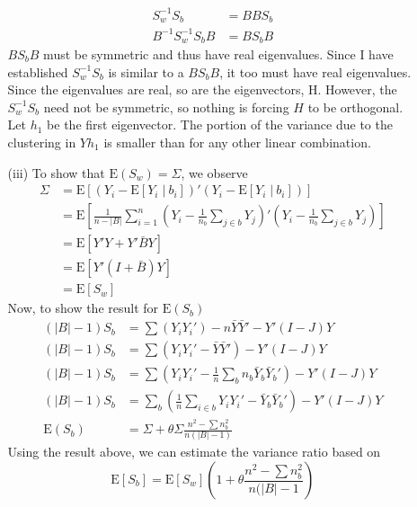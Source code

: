 \documentclass[11pt]{article}
\newcommand{\E}{\mathrm{E}}
\newcommand{\st}{ \; \big | \:}
\newcommand{\car}[1]{\left\vert #1 \right\vert}
\theoremstyle{definition}
\begin{document}
\begin{itemize}
\begin{itemize}
                \begin{align*}
                    S_w^{-1}S_b     &= BBS_b \\
                    B^{-1}S_w^{-1}S_bB &= BS_bB
                \end{align*}
                $BS_bB$ must be symmetric and thus have real eigenvalues. Since I have established $S_w^{-1}S_b$ is similar to a $BS_bB$, it too must have real eigenvalues. Since the eigenvalues are real, so are the eigenvectors, H. However, the $S_w^{-1}S_b$ need not be symmetric, so nothing is forcing $H$ to be orthogonal. Let $h_1$ be the first eigenvector. The portion of the variance due to the clustering in $Yh_1$ is smaller than for any other linear combination.
            \item[(iii)]
                To show that $\E(S_w)=\Sigma$, we observe
                \begin{align*}
                    \Sigma &= \E\left[\left(Y_i-\E[Y_i\st b_i]\right)'\left(Y_i-\E[Y_i\st b_i]\right)\right] \\
                           &= \E\left[\frac{1}{n-\car{B}}\sum_{i=1}^n\left(Y_i-\frac{1}{n_b}\sum_{j\in b} Y_j\right)'\left(Y_i-\frac{1}{n_b}\sum_{j\in b} Y_j\right)     \right] \\
                           &= \E\left[Y'Y + Y'\bar B Y\right] \\
                           &= \E\left[Y'(I+\bar B)Y\right] \\
                           &= \E\left[S_w\right] 
                \end{align*}
                Now, to show the result for $\E(S_b)$
                \begin{align*}
                    (\car{B}-1)S_b &= \sum(Y_iY_i') - n\bar Y\bar Y' - Y'(I-J)Y  \\
                    (\car{B}-1)S_b &= \sum(Y_iY_i'-\bar Y\bar Y') - Y'(I-J)Y  \\
                    (\car{B}-1)S_b &= \sum(Y_iY_i'-\frac{1}{n}\sum_b n_b\bar Y_b\bar Y_b') - Y'(I-J)Y  \\
                    (\car{B}-1)S_b &= \sum_b\left(\frac{1}{n}\sum_{i\in b}Y_iY_i'- \bar Y_b\bar Y_b'\right) - Y'(I-J)Y  \\
                    \E(S_b) &= \Sigma +\theta\Sigma\frac{n^2-\sum n^2_b}{n(\car{B}-1)}
                \end{align*}
                Using the result above, we can estimate the variance ratio based on 
                \[ \E\left[S_b\right] = \E\left[S_w\right]\left(1+\theta\frac{n^2-\sum n_b^2}{n(\car{B}-1}\right) \]

\end{itemize}
\end{itemize}
\end{document}
